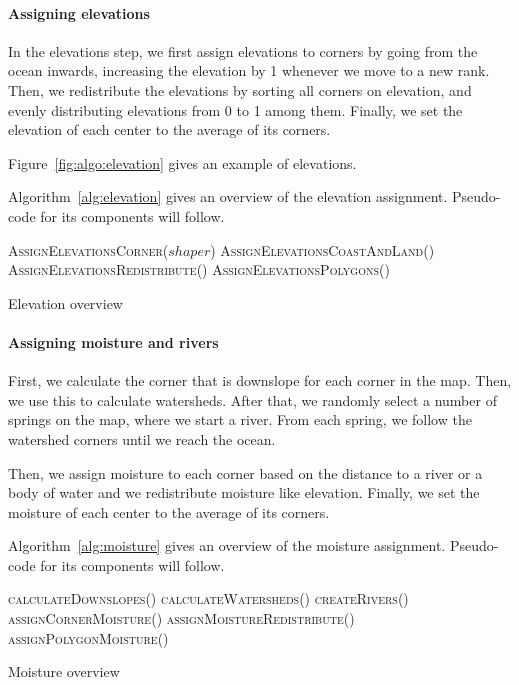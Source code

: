 \paragraph{Assigning elevations}

In the elevations step, we first assign elevations to corners by going from the ocean inwards, increasing the elevation by 1 whenever we move to a new rank.
Then, we redistribute the elevations by sorting all corners on elevation, and evenly distributing elevations from 0 to 1 among them.
Finally, we set the elevation of each center to the average of its corners.

Figure~\ref{fig:algo:elevation} gives an example of elevations.

Algorithm~\ref{alg:elevation} gives an overview of the elevation assignment.
Pseudo-code for its components will follow.

\begin{algo}[H]
\begin{sourcecode}
\textsc{AssignElevationsCorner}($shaper$)
\textsc{AssignElevationsCoastAndLand}()
\textsc{AssignElevationsRedistribute}()
\textsc{AssignElevationsPolygons}()
\qend
\end{sourcecode}
	\caption{Elevation overview}
	\label{alg:elevation}
\end{algo}

\paragraph{Assigning moisture and rivers}

First, we calculate the corner that is downslope for each corner in the map.
Then, we use this to calculate watersheds.
After that, we randomly select a number of springs on the map, where we start a river.
From each spring, we follow the watershed corners until we reach the ocean.

Then, we assign moisture to each corner based on the distance to a river or a body of water and we redistribute moisture like elevation.
Finally, we set the moisture of each center to the average of its corners.

Algorithm~\ref{alg:moisture} gives an overview of the moisture assignment.
Pseudo-code for its components will follow.

\begin{algo}[H]
\begin{sourcecode}
\textsc{calculateDownslopes}()
\textsc{calculateWatersheds}()
\textsc{createRivers}()
\textsc{assignCornerMoisture}()
\textsc{assignMoistureRedistribute}()
\textsc{assignPolygonMoisture}()
\qend
\end{sourcecode}
	\caption{Moisture overview}
	\label{alg:moisture}
\end{algo}

